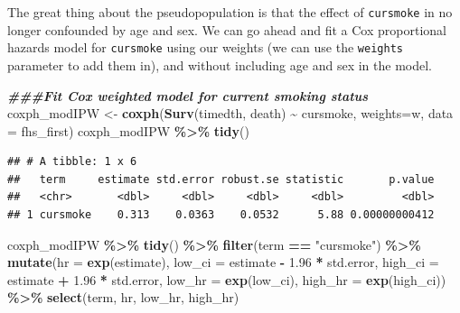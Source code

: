 \documentclass[
]{book}
\newenvironment{Shaded}{\begin{snugshade}}{\end{snugshade}}
\newcommand{\AttributeTok}[1]{\textcolor[rgb]{0.13,0.29,0.53}{#1}}
\newcommand{\DocumentationTok}[1]{\textcolor[rgb]{0.56,0.35,0.01}{\textbf{\textit{#1}}}}
\newcommand{\FloatTok}[1]{\textcolor[rgb]{0.00,0.00,0.81}{#1}}
\newcommand{\FunctionTok}[1]{\textcolor[rgb]{0.13,0.29,0.53}{\textbf{#1}}}
\newcommand{\NormalTok}[1]{#1}
\newcommand{\OtherTok}[1]{\textcolor[rgb]{0.56,0.35,0.01}{#1}}
\newcommand{\SpecialCharTok}[1]{\textcolor[rgb]{0.81,0.36,0.00}{\textbf{#1}}}
\newcommand{\StringTok}[1]{\textcolor[rgb]{0.31,0.60,0.02}{#1}}
\begin{document}
The great thing about the pseudopopulation is that the effect of \texttt{cursmoke} in no longer confounded by age and sex.
We can go ahead and fit a Cox proportional hazards model for \texttt{cursmoke} using our weights (we can use the \texttt{weights} parameter to add them in), and without including age and sex in the model.

\begin{Shaded}
\begin{Highlighting}[]
\DocumentationTok{\#\#\#Fit Cox weighted model for current smoking status}
\NormalTok{coxph\_modIPW }\OtherTok{\textless{}{-}} \FunctionTok{coxph}\NormalTok{(}\FunctionTok{Surv}\NormalTok{(timedth, death) }\SpecialCharTok{\textasciitilde{}}\NormalTok{ cursmoke, }\AttributeTok{weights=}\NormalTok{w,}
                    \AttributeTok{data =}\NormalTok{ fhs\_first)}
\NormalTok{coxph\_modIPW }\SpecialCharTok{\%\textgreater{}\%}
  \FunctionTok{tidy}\NormalTok{()}
\end{Highlighting}
\end{Shaded}

\begin{verbatim}
## # A tibble: 1 x 6
##   term     estimate std.error robust.se statistic       p.value
##   <chr>       <dbl>     <dbl>     <dbl>     <dbl>         <dbl>
## 1 cursmoke    0.313    0.0363    0.0532      5.88 0.00000000412
\end{verbatim}

\begin{Shaded}
\begin{Highlighting}[]
\NormalTok{coxph\_modIPW }\SpecialCharTok{\%\textgreater{}\%} 
  \FunctionTok{tidy}\NormalTok{() }\SpecialCharTok{\%\textgreater{}\%} 
  \FunctionTok{filter}\NormalTok{(term }\SpecialCharTok{==} \StringTok{"cursmoke"}\NormalTok{) }\SpecialCharTok{\%\textgreater{}\%} 
  \FunctionTok{mutate}\NormalTok{(}\AttributeTok{hr =} \FunctionTok{exp}\NormalTok{(estimate),}
         \AttributeTok{low\_ci =}\NormalTok{ estimate }\SpecialCharTok{{-}} \FloatTok{1.96} \SpecialCharTok{*}\NormalTok{ std.error, }
         \AttributeTok{high\_ci =}\NormalTok{ estimate }\SpecialCharTok{+} \FloatTok{1.96} \SpecialCharTok{*}\NormalTok{ std.error, }
         \AttributeTok{low\_hr =} \FunctionTok{exp}\NormalTok{(low\_ci), }
         \AttributeTok{high\_hr =} \FunctionTok{exp}\NormalTok{(high\_ci)) }\SpecialCharTok{\%\textgreater{}\%} 
  \FunctionTok{select}\NormalTok{(term, hr, low\_hr, high\_hr)}
\end{Highlighting}
\end{Shaded}
\end{document}
